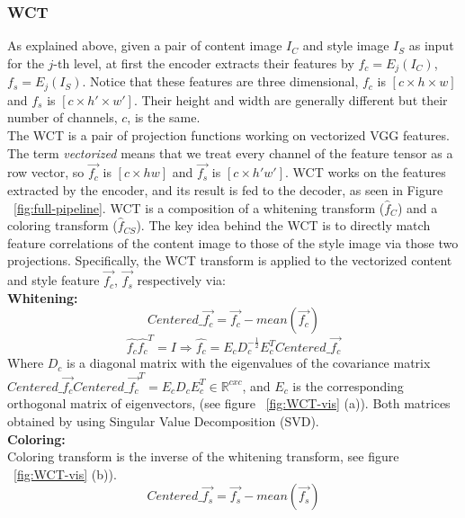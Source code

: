 \subsubsection{WCT} As explained above, given a pair of content image $I_C$ and style image $I_S$ as input for the $j$-th level, at first the encoder extracts their features by $f_c = E_j(I_C)$, $f_s = E_j(I_S)$. Notice that these features are three dimensional, $f_c$ is $[c\times h \times w]$ and $f_s$ is $[c\times h' \times w']$. Their height and width are generally different but their number of channels, $c$, is the same.\\
The WCT is a pair of projection functions working on vectorized VGG features. The term \textit{vectorized} means that we treat every channel of the feature tensor as a row vector, so $\vec{f_c}$ is $[c \times hw]$ and $\vec{f_s}$ is $[c \times h'w']$. WCT works on the features extracted by the encoder, and its result is fed to the decoder, as seen in Figure ~\ref{fig:full-pipeline}. WCT is a composition of a whitening transform ($\hat{f}_C$) and a coloring transform ($\hat{f}_{CS}$). The key idea behind the WCT is to directly match feature correlations of the content image to those of the style image via those two projections. Specifically, the WCT transform is applied to the vectorized content and style feature $\vec{f_c}$, $\vec{f_s}$ respectively via:\\
\textbf{Whitening:}\\
\begin{equation}
Centered\_\vec{f_c} = \vec{f_c} - mean(\vec{f_c})
\end{equation}
\begin{equation}
\hat{f_c}\hat{f_c}^T=I \Rightarrow  \hat{f_c} = E_cD_c^{-\frac{1}{2}}E_c^TCentered\_\vec{f_c} 
\end{equation}
Where $D_c$ is a diagonal matrix with the eigenvalues of the covariance matrix $Centered\_\vec{f_c}Centered\_\vec{f_c}^T=E_cD_cE_c^T \in\mathbb{R}^{cxc}$, and $E_c$ is the corresponding orthogonal matrix of eigenvectors, (see figure ~\ref{fig:WCT-vis} (a)). Both matrices obtained by using Singular Value Decomposition (SVD).\\
\newline\textbf{Coloring:}\\
Coloring transform is the inverse of the whitening transform, see figure ~\ref{fig:WCT-vis} (b)).
\begin{equation}
Centered\_\vec{f_s} = \vec{f_s} - mean(\vec{f_s})
\end{equation}
